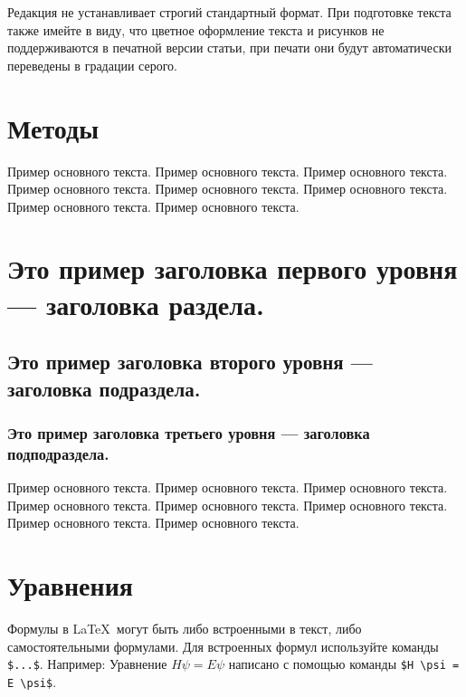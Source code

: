 \documentclass[pdflatex,sn-mathphys-gost]{pmi-jnl}
\begin{document}
Редакция не устанавливает строгий стандартный формат. При подготовке текста также имейте в виду, что цветное оформление текста и рисунков не поддерживаются в печатной версии статьи, при печати они будут автоматически переведены в градации серого.

\section{Методы}\label{sec2}

Пример основного текста. Пример основного текста. Пример основного текста. Пример основного текста. Пример основного текста. Пример основного текста. Пример основного текста. Пример основного текста.

\section{Это пример заголовка первого уровня — заголовка раздела.}\label{sec3}

\subsection{Это пример заголовка второго уровня — заголовка подраздела.}\label{subsec2}

\subsubsection{
Это пример заголовка третьего уровня — заголовка подподраздела.}\label{subsubsec2}

Пример основного текста. Пример основного текста. Пример основного текста. Пример основного текста. Пример основного текста. Пример основного текста. Пример основного текста. Пример основного текста. 

\section{Уравнения}\label{sec4}

Формулы в \LaTeX\ могут быть либо встроенными в текст, либо самостоятельными формулами. Для встроенных формул используйте команды \verb+$...$+. Например: Уравнение
$H\psi = E \psi$ написано с помощью команды \verb+$H \psi = E \psi$+.
\end{document}
